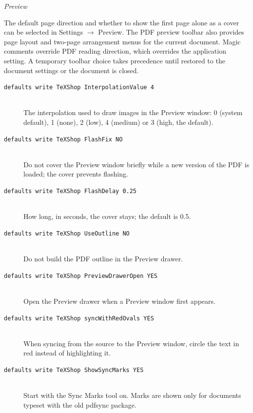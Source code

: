 \documentclass[11pt, oneside]{article}   	%
\begin{document}
{\em Preview}

The default page direction and whether to show the first page alone as a cover
can be selected in Settings $\rightarrow$ Preview. The PDF preview toolbar
also provides page layout and two-page arrangement menus for the current document.
Magic comments override PDF reading direction, which overrides the application
setting. A temporary toolbar choice takes precedence until restored to the
document settings or the document is closed.

\begin{description}
\item[\texttt{defaults write TeXShop InterpolationValue 4}] \hfill \\
The interpolation used to draw images in the Preview window: 0 (system default), 1 (none), 2 (low), 4 (medium) or 3 (high, the default).
\item[\texttt{defaults write TeXShop FlashFix NO}] \hfill \\
Do not cover the Preview window briefly while a new version of the PDF is loaded; the cover prevents flashing.
\item[\texttt{defaults write TeXShop FlashDelay 0.25}] \hfill \\
How long, in seconds, the cover stays; the default is 0.5.
\item[\texttt{defaults write TeXShop UseOutline NO}] \hfill \\
Do not build the PDF outline in the Preview drawer.
\item[\texttt{defaults write TeXShop PreviewDrawerOpen YES}] \hfill \\
Open the Preview drawer when a Preview window first appears.
\item[\texttt{defaults write TeXShop syncWithRedOvals YES}] \hfill \\
When syncing from the source to the Preview window, circle the text in red instead of highlighting it.
\item[\texttt{defaults write TeXShop ShowSyncMarks YES}] \hfill \\
Start with the Sync Marks tool on. Marks are shown only for documents typeset with the old pdfsync package.
\end{description}
\end{document}
